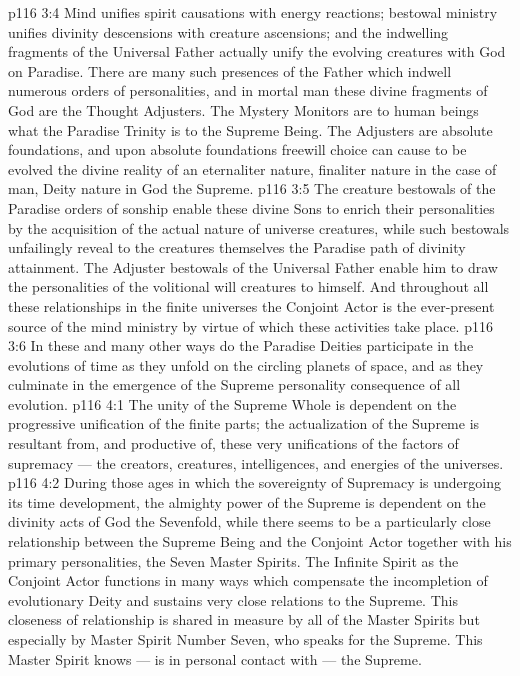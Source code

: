 \vs p116 3:4 \pc {}\bibnobreakspace {} Mind unifies spirit causations with energy reactions; bestowal ministry unifies divinity descensions with creature ascensions; and the indwelling fragments of the Universal Father actually unify the evolving creatures with God on Paradise. There are many such presences of the Father which indwell numerous orders of personalities, and in mortal man these divine fragments of God are the Thought Adjusters. The Mystery Monitors are to human beings what the Paradise Trinity is to the Supreme Being. The Adjusters are absolute foundations, and upon absolute foundations freewill choice can cause to be evolved the divine reality of an eternaliter nature, finaliter nature in the case of man, Deity nature in God the Supreme.
\vs p116 3:5 \pc The creature bestowals of the Paradise orders of sonship enable these divine Sons to enrich their personalities by the acquisition of the actual nature of universe creatures, while such bestowals unfailingly reveal to the creatures themselves the Paradise path of divinity attainment. The Adjuster bestowals of the Universal Father enable him to draw the personalities of the volitional will creatures to himself. And throughout all these relationships in the finite universes the Conjoint Actor is the ever\hyp{}present source of the mind ministry by virtue of which these activities take place.
\vs p116 3:6 In these and many other ways do the Paradise Deities participate in the evolutions of time as they unfold on the circling planets of space, and as they culminate in the emergence of the Supreme personality consequence of all evolution.
\vs p116 4:1 The unity of the Supreme Whole is dependent on the progressive unification of the finite parts; the actualization of the Supreme is resultant from, and productive of, these very unifications of the factors of supremacy --- the creators, creatures, intelligences, and energies of the universes.
\vs p116 4:2 \pc During those ages in which the sovereignty of Supremacy is undergoing its time development, the almighty power of the Supreme is dependent on the divinity acts of God the Sevenfold, while there seems to be a particularly close relationship between the Supreme Being and the Conjoint Actor together with his primary personalities, the Seven Master Spirits. The Infinite Spirit as the Conjoint Actor functions in many ways which compensate the incompletion of evolutionary Deity and sustains very close relations to the Supreme. This closeness of relationship is shared in measure by all of the Master Spirits but especially by Master Spirit Number Seven, who speaks for the Supreme. This Master Spirit knows --- is in personal contact with --- the Supreme.
